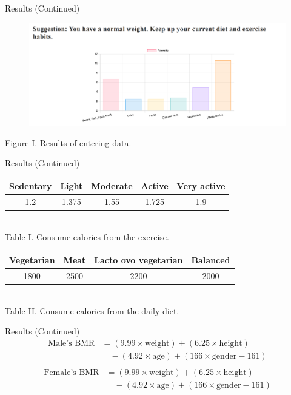 \documentclass[fleqn]{beamer}
\begin{document}
\begin{frame}{Results (Continued)}
\pause
\begin{figure}[h]
    \centering
    \includegraphics[width=\textwidth]{Example.png}
\end{figure}
    \centering
    Figure I. Results of entering data.
\end{frame}
\begin{frame}{Results (Continued)}
\vspace{1.5cm}
\sloppy
\pause
\renewcommand{\arraystretch}{1.35}
\centering
\begin{tabular}{|c|c|c|c|c|}
\hline
Sedentary & Light & Moderate & Active & Very active \\
\hline
1.2 & 1.375 & 1.55 & 1.725 & 1.9 \\
\hline
\end{tabular}
\vspace{0.5cm} 
\\
Table I. Consume calories from the exercise. 
\vspace{0.5cm} 
\\
\pause
\begin{tabular}{|c|c|c|c|}
\hline
Vegetarian & Meat & Lacto ovo vegetarian & Balanced \\
\hline
1800 & 2500 & 2200 & 2000 \\
\hline
\end{tabular}
\vspace{0.5cm} 
\\
Table II. Consume calories from the daily diet. 
\vspace{1cm} 
\\
\end{frame}
\begin{frame}{Results (Continued)}
\sloppy
\pause
\begin{align*}
    \text{Male's BMR} &= (9.99 \times \text{weight}) + (6.25 \times \text{height}) \\
    &\quad - (4.92 \times \text{age}) + (166 \times \text{gender} - 161) \\
\end{align*}
\pause
\begin{align*}
    \text{Female's BMR} &= (9.99 \times \text{weight}) + (6.25 \times \text{height}) \\
    &\quad - (4.92 \times \text{age}) + (166 \times \text{gender} - 161)
\end{align*}
\end{frame}
\end{document}

